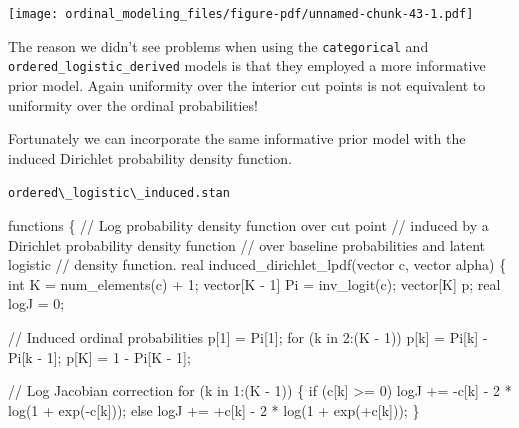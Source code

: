 \documentclass[
  letterpaper,
  DIV=11,
  numbers=noendperiod]{scrartcl}
\newenvironment{Shaded}{\begin{snugshade}}{\end{snugshade}}
\newcommand{\CommentTok}[1]{\textcolor[rgb]{0.37,0.37,0.37}{#1}}
\newcommand{\ControlFlowTok}[1]{\textcolor[rgb]{0.00,0.23,0.31}{#1}}
\newcommand{\DataTypeTok}[1]{\textcolor[rgb]{0.68,0.00,0.00}{#1}}
\newcommand{\DecValTok}[1]{\textcolor[rgb]{0.68,0.00,0.00}{#1}}
\newcommand{\KeywordTok}[1]{\textcolor[rgb]{0.00,0.23,0.31}{#1}}
\newcommand{\NormalTok}[1]{\textcolor[rgb]{0.00,0.23,0.31}{#1}}
\begin{document}
\texttt{[image: ordinal\_modeling\_files/figure-pdf/unnamed-chunk-43-1.pdf]}

The reason we didn't see problems when using the \texttt{categorical}
and \texttt{ordered\_logistic\_derived} models is that they employed a
more informative prior model. Again uniformity over the interior cut
points is not equivalent to uniformity over the ordinal probabilities!

Fortunately we can incorporate the same informative prior model with the
induced Dirichlet probability density function.

\begin{codelisting}

\caption{\texttt{ordered\textbackslash\_logistic\textbackslash\_induced.stan}}

\begin{Shaded}
\begin{Highlighting}[]
\KeywordTok{functions}\NormalTok{ \{}
  \CommentTok{// Log probability density function over cut point}
  \CommentTok{// induced by a Dirichlet probability density function}
  \CommentTok{// over baseline probabilities and latent logistic}
  \CommentTok{// density function.}
  \DataTypeTok{real}\NormalTok{ induced\_dirichlet\_lpdf(}\DataTypeTok{vector}\NormalTok{ c, }\DataTypeTok{vector}\NormalTok{ alpha) \{}
    \DataTypeTok{int}\NormalTok{ K = num\_elements(c) + }\DecValTok{1}\NormalTok{;}
    \DataTypeTok{vector}\NormalTok{[K {-} }\DecValTok{1}\NormalTok{] Pi = inv\_logit(c);}
    \DataTypeTok{vector}\NormalTok{[K] p;}
    \DataTypeTok{real}\NormalTok{ logJ = }\DecValTok{0}\NormalTok{;}

    \CommentTok{// Induced ordinal probabilities}
\NormalTok{    p[}\DecValTok{1}\NormalTok{] = Pi[}\DecValTok{1}\NormalTok{];}
    \ControlFlowTok{for}\NormalTok{ (k }\ControlFlowTok{in} \DecValTok{2}\NormalTok{:(K {-} }\DecValTok{1}\NormalTok{))}
\NormalTok{      p[k] = Pi[k] {-} Pi[k {-} }\DecValTok{1}\NormalTok{];}
\NormalTok{    p[K] = }\DecValTok{1}\NormalTok{ {-} Pi[K {-} }\DecValTok{1}\NormalTok{];}

    \CommentTok{// Log Jacobian correction}
    \ControlFlowTok{for}\NormalTok{ (k }\ControlFlowTok{in} \DecValTok{1}\NormalTok{:(K {-} }\DecValTok{1}\NormalTok{)) \{}
      \ControlFlowTok{if}\NormalTok{ (c[k] \textgreater{}= }\DecValTok{0}\NormalTok{)}
\NormalTok{        logJ += {-}c[k] {-} }\DecValTok{2}\NormalTok{ * log(}\DecValTok{1}\NormalTok{ + exp({-}c[k]));}
      \ControlFlowTok{else}
\NormalTok{        logJ += +c[k] {-} }\DecValTok{2}\NormalTok{ * log(}\DecValTok{1}\NormalTok{ + exp(+c[k]));}
\NormalTok{    \}}


\end{Highlighting}
\end{Shaded}
\end{codelisting}
\end{document}
